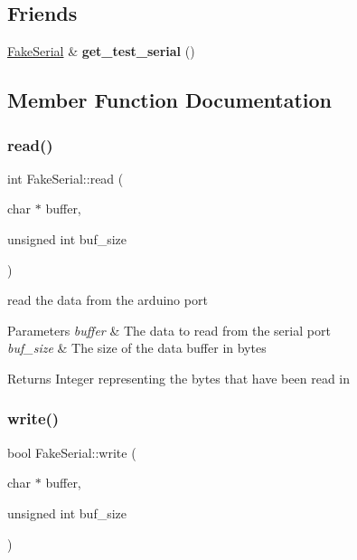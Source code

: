 \subsection*{Friends}
\begin{DoxyCompactItemize}
\item 
\mbox{\label{structFakeSerial_abcbec8b664bd5afa556ae8ae6e8d1b8d}} 
\mbox{\hyperlink{structFakeSerial}{Fake\+Serial}} \& {\bfseries get\+\_\+test\+\_\+serial} ()
\end{DoxyCompactItemize}


\subsection{Member Function Documentation}
\mbox{\label{structFakeSerial_ade2cc0ebb2014c45bdf2f5fb622da418}} 
\subsubsection{\texorpdfstring{read()}{read()}}
{\footnotesize\ttfamily int Fake\+Serial\+::read (\begin{DoxyParamCaption}\item[{char $\ast$}]{buffer,  }\item[{unsigned int}]{buf\+\_\+size }\end{DoxyParamCaption})}



read the data from the arduino port 


\begin{DoxyParams}{Parameters}
{\em buffer} & The data to read from the serial port \\
\hline
{\em buf\+\_\+size} & The size of the data buffer in bytes \\
\hline
\end{DoxyParams}
\begin{DoxyReturn}{Returns}
Integer representing the bytes that have been read in 
\end{DoxyReturn}
\mbox{\label{structFakeSerial_ab25e13142d016f62831867434bcbd7cd}} 
\subsubsection{\texorpdfstring{write()}{write()}}
{\footnotesize\ttfamily bool Fake\+Serial\+::write (\begin{DoxyParamCaption}\item[{char $\ast$}]{buffer,  }\item[{unsigned int}]{buf\+\_\+size }\end{DoxyParamCaption})}



